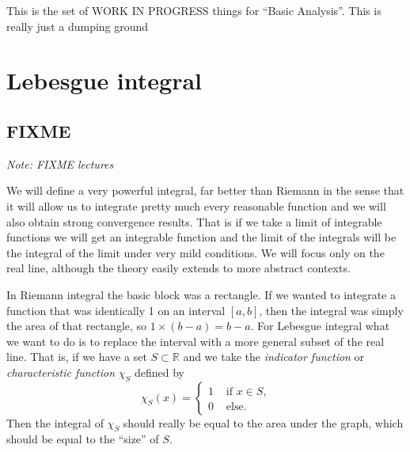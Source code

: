 \documentclass[12pt]{book}
\newcommand{\R}{{\mathbb{R}}}
\newcommand{\sectionnotes}[1]{\noindent \emph{Note: #1} \medskip \par}
\theoremstyle{plain}
\theoremstyle{remark}
\theoremstyle{definition}
\theoremstyle{exercise}
\theoremstyle{example}
\begin{document}
This is the set of WORK IN PROGRESS things for
``Basic Analysis''.   This is really just a dumping ground





\chapter{Lebesgue integral} \label{lebesgue:chapter}



\section{FIXME}
\label{sec:FIXME}

\sectionnotes{FIXME lectures}

We will define a very powerful integral, far better than Riemann in the
sense that it will allow us to integrate pretty much every reasonable
function and we will also obtain strong convergence results.  That is
if we take a limit of integrable functions we will get an integrable
function and the limit of the integrals will be the integral of the limit
under very mild conditions.  We will focus only on the real line, although
the theory easily extends to more abstract contexts.

\medskip

In Riemann integral the basic block was a rectangle.  If we wanted to
integrate a function that was identically 1 on an interval $[a,b]$, then the
integral was simply the area of that rectangle, so $1 \times (b-a) = b-a$.
For Lebesgue integral what we want to do is to replace the interval with a
more general subset of the real line.  That is, if we have a set $S \subset
\R$ and we take the \emph{indicator function} or \emph{characteristic
function} $\chi_S$ defined by
$$
\chi_S (x) =
\begin{cases}
1 & \text{ if $x \in S$,} \\
0 & \text{ else.}
\end{cases}
$$
Then the integral of $\chi_S$ should really be equal to the area under the
graph, which should be equal to the ``size'' of $S$.
\end{document}
